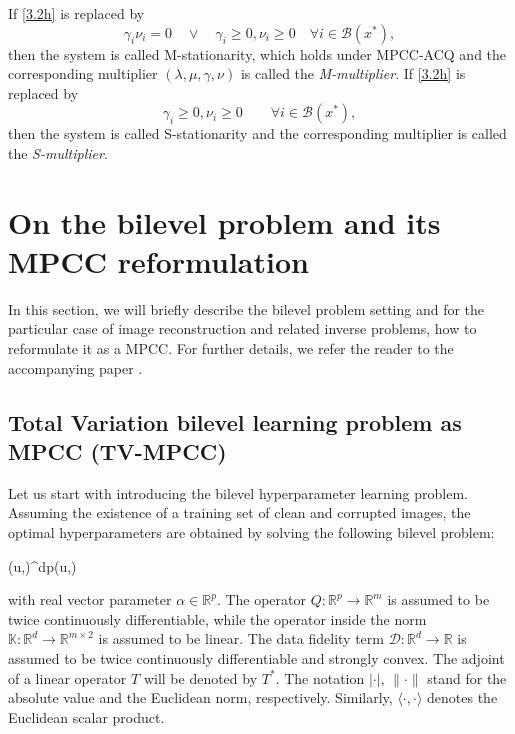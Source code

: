 \documentclass[review,onefignum,onetabnum]{siamonline190516}
\newcommand{\R}{\mathbb{R}}
\newcommand{\Jcal}{\mathcal{J}}
\newcommand{\Dcal}{\mathcal{D}}
\DeclareMathOperator*{\argmin}{arg\,min}
\newcommand{\scalar}[2]{\langle #1 , #2 \rangle}
\begin{document}
If \eqref{3.2h} is replaced by 
$$
\gamma_i\nu_i=0\quad \vee \quad \gamma_i\geq 0, \nu_i\geq 0\quad \forall i\in \mathcal{B}(x^*),
$$
then the system is called M-stationarity, which holds under MPCC-ACQ and the corresponding multiplier $(\lambda,\mu,\gamma,\nu)$ is called the \textit{M-multiplier}. If \eqref{3.2h} is replaced by 
$$
\gamma_i\geq 0, \nu_i\geq 0\qquad \forall i\in \mathcal{B}(x^*),
$$
then the system is called S-stationarity and the corresponding multiplier is called the \textit{S-multiplier}.

\section{On the bilevel problem and its MPCC reformulation}\label{sec:mpcc_formulation}
In this section, we will briefly describe the bilevel problem setting and for the particular case of image reconstruction and related inverse problems, how to reformulate it as a MPCC. For further details, we refer the reader to the accompanying paper \cite{de2023bilevel}.
\subsection{Total Variation bilevel learning problem as MPCC (TV-MPCC)}
Let us start with introducing the bilevel hyperparameter learning problem. Assuming the existence of a training set of clean and corrupted images, the optimal hyperparameters are obtained by solving the following bilevel problem:
\begin{mini!}
{(u,\alpha)\in\R^{d\times p}}{\Jcal(u,\alpha)}{}{}
\addConstraint{u=\argmin_{v\in\R^d}\left\{\Dcal(v)+\sum_{j=1}^{m} Q(\alpha)_j \|(\mathbb{K} v)_j\|\right\}}
\end{mini!}
with real vector parameter $\alpha\in\R^p$. The operator $Q:\R^p\to\R^{m}$ is assumed to be twice continuously differentiable, while the operator inside the norm $\mathbb{K}:\R^d\to\R^{m\times 2}$ is assumed to be linear. The data fidelity term $\Dcal:\R^{d}\to\R$ is assumed to be twice continuously differentiable and strongly convex. The adjoint of a linear operator $T$ will be denoted by $T^*$. The notation $|\cdot|$, $\|\cdot\|$ stand for the absolute value and the Euclidean norm, respectively. Similarly, $\scalar{\cdot}{\cdot}$ denotes the Euclidean scalar product.
\end{document}
